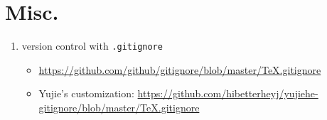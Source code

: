 \section{Misc.}

\begin{enumerate}
    \item version control with \texttt{.gitignore}
    
    \begin{itemize}
        \item \url{https://github.com/github/gitignore/blob/master/TeX.gitignore}
        \item Yujie's customization: \url{https://github.com/hibetterheyj/yujiehe-gitignore/blob/master/TeX.gitignore}
    \end{itemize}
    
    
\end{enumerate}